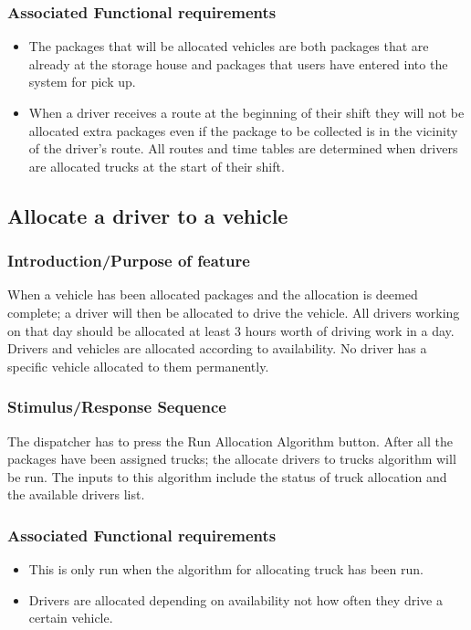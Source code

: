 \documentclass[paper=a4, fontsize=11pt]{scrartcl} %
\numberwithin{equation}{section} %
\numberwithin{figure}{section} %
\numberwithin{table}{section} %
\begin{document}
\subsubsection{Associated Functional requirements}
\begin{itemize}
			\item The packages that will be allocated vehicles are both packages that are already at the storage house and packages that users have entered into the system for pick up.
			\item When a driver receives a route at the beginning of their shift they will not be allocated extra packages even if the package to be collected is in the vicinity of the driver's route. All routes and time tables are determined when drivers are allocated trucks at the start of their shift.
\end{itemize}
	
\subsection{Allocate a driver to a vehicle}
\subsubsection{Introduction/Purpose of feature}
When a vehicle has been allocated packages and the allocation is deemed complete; a driver will then be allocated to drive the vehicle.  All drivers working on that day should be allocated at least 3 hours worth of driving work in a day. Drivers and vehicles are allocated according to availability. No driver has a specific vehicle allocated to them permanently.
\subsubsection{Stimulus/Response Sequence}
The dispatcher has to press the Run Allocation Algorithm button. After all the packages have been assigned trucks; the allocate drivers to trucks algorithm will be run. The inputs to this algorithm include the status of truck allocation and the available drivers list. 
\subsubsection{Associated Functional requirements}
\begin{itemize}
			\item This is only run when the algorithm for allocating truck has been run.
			\item Drivers are allocated depending on availability not how often they drive a certain vehicle.
\end{itemize}
	
\end{document}

